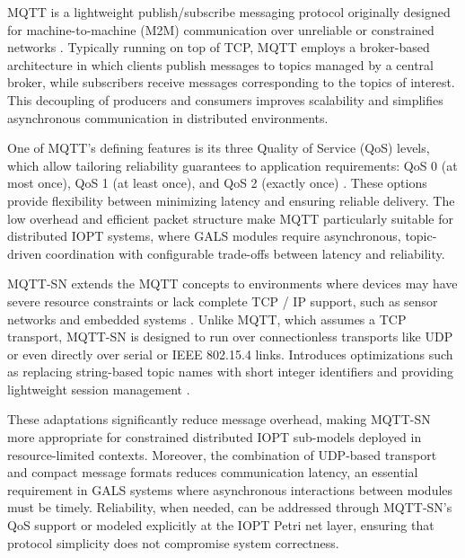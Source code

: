 MQTT is a lightweight publish/subscribe messaging protocol originally designed for machine-to-machine (M2M) communication over unreliable or constrained networks \cite{oasis2019mqtt, banks2014mqtt}. Typically running on top of TCP, MQTT employs a broker-based architecture in which clients publish messages to topics managed by a central broker, while subscribers receive messages corresponding to the topics of interest. This decoupling of producers and consumers improves scalability and simplifies asynchronous communication in distributed environments.

One of MQTT’s defining features is its three Quality of Service (QoS) levels, which allow tailoring reliability guarantees to application requirements: QoS 0 (at most once), QoS 1 (at least once), and QoS 2 (exactly once) \cite{oasis2019mqtt}. These options provide flexibility between minimizing latency and ensuring reliable delivery. The low overhead and efficient packet structure make MQTT particularly suitable for distributed IOPT systems, where GALS modules require asynchronous, topic-driven coordination with configurable trade-offs between latency and reliability.

MQTT-SN extends the MQTT concepts to environments where devices may have severe resource constraints or lack complete TCP / IP support, such as sensor networks and embedded systems \cite{singh2015mqttsn, confusion2013mqttsn}. Unlike MQTT, which assumes a TCP transport, MQTT-SN is designed to run over connectionless transports like UDP or even directly over serial or IEEE 802.15.4 links. Introduces optimizations such as replacing string-based topic names with short integer identifiers and providing lightweight session management \cite{singh2015mqttsn}. 

These adaptations significantly reduce message overhead, making MQTT-SN more appropriate for constrained distributed IOPT sub-models deployed in resource-limited contexts. Moreover, the combination of UDP-based transport and compact message formats reduces communication latency, an essential requirement in GALS systems where asynchronous interactions between modules must be timely. Reliability, when needed, can be addressed through MQTT-SN’s QoS support or modeled explicitly at the IOPT Petri net layer, ensuring that protocol simplicity does not compromise system correctness.

